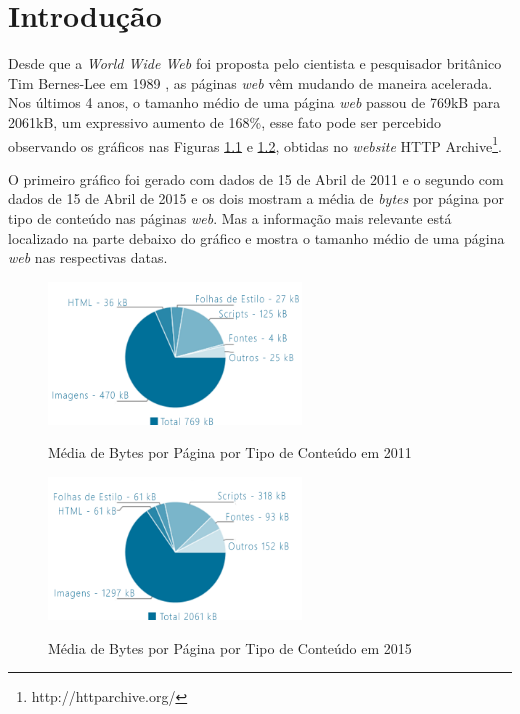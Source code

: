 %
%

\chapter{Introdução}\label{chap:introducao}

Desde que a \textit{World Wide Web} foi proposta pelo cientista e pesquisador britânico Tim Bernes-Lee em 1989 \cite{WebHistory}, as páginas \textit{web} vêm mudando de maneira acelerada. Nos últimos 4 anos, o tamanho médio de uma página \textit{web} passou de 769kB para 2061kB, um expressivo aumento de 168\%, esse fato pode ser percebido observando os gráficos nas Figuras \ref{fig:httpcontenttype2011} e \ref{fig:httpcontenttype2015}, obtidas no \textit{website} HTTP Archive\footnote{http://httparchive.org/}.

O primeiro gráfico foi gerado com dados de 15 de Abril de 2011 e o segundo com dados de 15 de Abril de 2015 e os dois mostram a média de \textit{bytes} por página por tipo de conteúdo nas páginas \textit{web}. Mas a informação mais relevante está localizado na parte debaixo do gráfico e mostra o tamanho médio de uma página \textit{web} nas respectivas datas.

\begin{figure}[!htb]
    \centering
    \caption{Média de Bytes por Página por Tipo de Conteúdo em 2011}
    \includegraphics[width=0.6\textwidth]{./04-figuras/introducao/bytes_content_type_april_2011}
    \label{fig:httpcontenttype2011}
\end{figure}

\begin{figure}[!htb]
    \centering
    \caption{Média de Bytes por Página por Tipo de Conteúdo em 2015}
    \includegraphics[width=0.6\textwidth]{./04-figuras/introducao/bytes_content_type_april_2015}
    \label{fig:httpcontenttype2015}
\end{figure}

